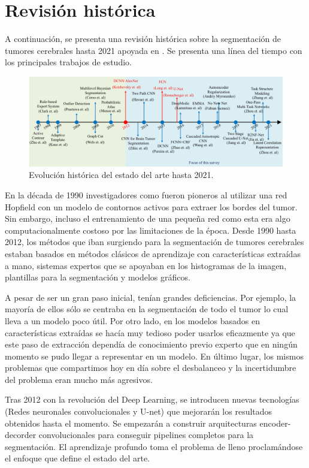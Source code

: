 \section{Revisión histórica}

	A continuación, se presenta una revisión histórica sobre la segmentación de tumores cerebrales hasta 2021 apoyada en \cite{liu2023deep}. Se presenta una línea del tiempo con los principales trabajos de estudio.
	
	\begin{figure}[!h]
		\centering
		\includegraphics[width=1.0\linewidth]{imagenes/evolution_stateofart.png}
		\caption{Evolución histórica del estado del arte hasta 2021.}
	\end{figure}
	
	En la década de 1990 investigadores como \cite{zhu1997computerized} fueron pioneros al utilizar una red Hopfield con un modelo de contornos activos para extraer los bordes del tumor. Sin embargo, incluso el entrenamiento de una pequeña red como esta era algo computacionalmente costoso por las limitaciones de la época.  Desde 1990 hasta 2012, los métodos que iban surgiendo para la segmentación de tumores cerebrales estaban basados en métodos clásicos de aprendizaje con características extraídas a mano, sistemas expertos que se apoyaban en los histogramas de la imagen, plantillas para la segmentación y modelos gráficos. 
	
	A pesar de ser un gran paso inicial, tenían grandes deficiencias. Por ejemplo, la mayoría de ellos sólo se centraba en la segmentación de todo el tumor lo cual lleva a un modelo poco útil. Por otro lado, en los modelos basados en características extraídas se hacía muy tedioso poder usarlos eficazmente ya que este paso de extracción dependía de conocimiento previo experto que en ningún momento se pudo llegar a representar en un modelo. En último lugar, los mismos problemas que compartimos hoy en día sobre el desbalanceo y la incertidumbre del problema eran mucho más agresivos. 
	
	Tras 2012 con la revolución del Deep Learning, se introducen nuevas tecnologías (Redes neuronales convolucionales y U-net) que mejorarán los resultados obtenidos hasta el momento. 
	Se empezarán a construir arquitecturas encoder-decorder convolucionales para conseguir pipelines completos para la segmentación. El aprendizaje profundo toma el problema de lleno proclamándose el enfoque que define el estado del arte.
	
